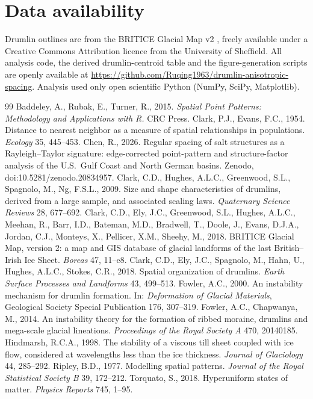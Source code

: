 \documentclass[11pt]{article}
\begin{document}
\section*{Data availability}
Drumlin outlines are from the BRITICE Glacial Map v2 \citep{clark2018britice}, freely available under a
Creative Commons Attribution licence from the University of Sheffield. All analysis code, the derived
drumlin-centroid table and the figure-generation scripts are openly available at
\url{https://github.com/Ruqing1963/drumlin-anisotropic-spacing}. Analysis used only open scientific
Python (NumPy, SciPy, Matplotlib).

\begin{thebibliography}{99}
\small
{} Baddeley, A., Rubak, E., Turner, R., 2015.
\textit{Spatial Point Patterns: Methodology and Applications with R.} CRC Press.
 Clark, P.J., Evans, F.C., 1954. Distance to nearest neighbor as a
measure of spatial relationships in populations. \textit{Ecology} 35, 445--453.
 Chen, R., 2026. Regular spacing of salt structures as a
Rayleigh--Taylor signature: edge-corrected point-pattern and structure-factor analysis of the U.S.\ Gulf
Coast and North German basins. Zenodo, doi:10.5281/zenodo.20834957.
 Clark, C.D., Hughes, A.L.C., Greenwood, S.L., Spagnolo, M., Ng,
F.S.L., 2009. Size and shape characteristics of drumlins, derived from a large sample, and associated
scaling laws. \textit{Quaternary Science Reviews} 28, 677--692.
 Clark, C.D., Ely, J.C., Greenwood, S.L., Hughes, A.L.C.,
Meehan, R., Barr, I.D., Bateman, M.D., Bradwell, T., Doole, J., Evans, D.J.A., Jordan, C.J., Monteys, X.,
Pellicer, X.M., Sheehy, M., 2018. BRITICE Glacial Map, version 2: a map and GIS database of glacial
landforms of the last British--Irish Ice Sheet. \textit{Boreas} 47, 11--e8.
 Clark, C.D., Ely, J.C., Spagnolo, M., Hahn, U., Hughes,
A.L.C., Stokes, C.R., 2018. Spatial organization of drumlins. \textit{Earth Surface Processes and
Landforms} 43, 499--513.
 Fowler, A.C., 2000. An instability mechanism for drumlin formation.
In: \textit{Deformation of Glacial Materials}, Geological Society Special Publication 176, 307--319.
 Fowler, A.C., Chapwanya, M., 2014. An instability theory
for the formation of ribbed moraine, drumlins and mega-scale glacial lineations.
\textit{Proceedings of the Royal Society A} 470, 20140185.
 Hindmarsh, R.C.A., 1998. The stability of a viscous till sheet
coupled with ice flow, considered at wavelengths less than the ice thickness. \textit{Journal of
Glaciology} 44, 285--292.
 Ripley, B.D., 1977. Modelling spatial patterns. \textit{Journal of the
Royal Statistical Society B} 39, 172--212.
 Torquato, S., 2018. Hyperuniform states of matter.
\textit{Physics Reports} 745, 1--95.
\end{thebibliography}
\end{document}
